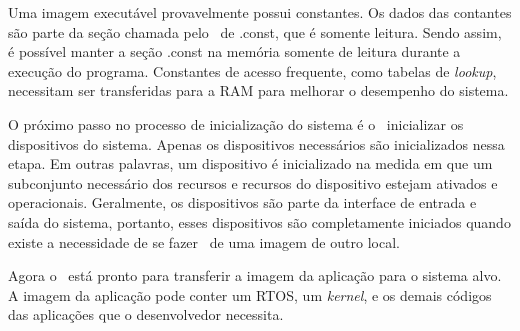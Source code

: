 Uma imagem executável provavelmente possui constantes. Os dados das contantes são parte da seção chamada pelo \linker\ de .const, que é somente leitura. Sendo assim, é possível manter a seção .const na memória somente de leitura durante a execução do programa. Constantes de acesso frequente, como tabelas de \textit{lookup}, necessitam ser transferidas para a RAM para melhorar o desempenho do sistema.

O próximo passo no processo de inicialização do sistema é o \loader\ inicializar os dispositivos do sistema. Apenas os dispositivos necessários são inicializados nessa etapa. Em outras palavras, um dispositivo é inicializado na medida em que um subconjunto necessário dos recursos e recursos do dispositivo estejam ativados e operacionais. Geralmente, os dispositivos são parte da interface de entrada e saída do sistema, portanto, esses dispositivos são completamente iniciados quando existe a necessidade de se fazer \download\ de uma imagem de outro local.

Agora o \loader\ está pronto para transferir a imagem da aplicação para o sistema alvo. A imagem da aplicação pode conter um RTOS, um \textit{kernel}, e os demais códigos das aplicações que o desenvolvedor necessita.






